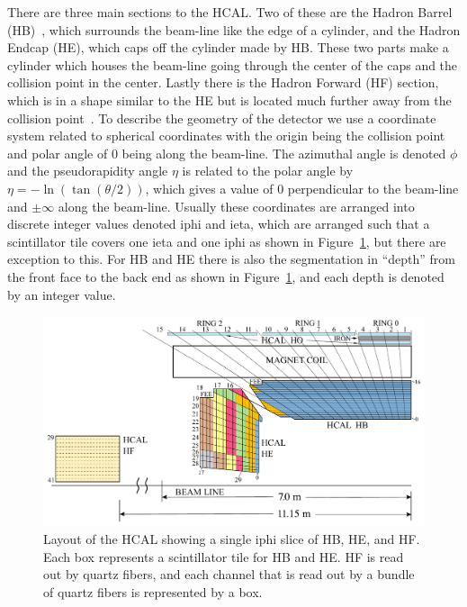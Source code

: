 There are three main sections to the HCAL. Two of these are the Hadron Barrel (HB)~\cite{HB}, which surrounds the beam-line like the edge of a cylinder, and the Hadron Endcap (HE), which caps off the cylinder made by HB. These two parts make a cylinder which houses the beam-line going through the center of the caps and the collision point in the center. Lastly there is the Hadron Forward (HF) section, which is in a shape similar to the HE but is located much further away from the collision point~\cite{HF}. To describe the geometry of the detector we use a coordinate system related to spherical coordinates with the origin being the collision point and polar angle of 0 being along the beam-line. The azimuthal angle is denoted $\phi$ and the pseudorapidity angle $\eta$ is related to the polar angle by $\eta = -\ln(\tan(\theta/2))$, which gives a value of 0 perpendicular to the beam-line and $\pm\infty$ along the beam-line. Usually these coordinates are arranged into discrete integer values denoted iphi and ieta, which are arranged such that a scintillator tile covers one ieta and one iphi as shown in Figure~\ref{fig:Depth}, but there are exception to this. For HB and HE there is also the segmentation in ``depth'' from the front face to the back end as shown in Figure~\ref{fig:Depth}, and each depth is denoted by an integer value. 


\begin{figure}
\centering
\includegraphics[width=\linewidth]{Figures/Depthsegmentation.pdf}
\caption{Layout of the HCAL showing a single iphi slice of HB, HE, and HF. Each box represents a scintillator tile for HB and HE. HF is read out by quartz fibers, and each channel that is read out by a bundle of quartz fibers is represented by a box.}
\label{fig:Depth}
\end{figure}

